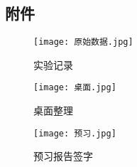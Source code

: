 \documentclass[dvipsnames, svgnames,a4paper,11pt]{article}
\begin{document}
	\subsection{附件}
	\begin{figure}[H]
		\begin{minipage}[b]{0.3\linewidth}
		  \centering
		  \texttt{[image: 原始数据.jpg]}
		  \caption{实验记录}
		\end{minipage}
		\hfill
		\begin{minipage}[b]{0.3\linewidth}
		  \centering
		  \texttt{[image: 桌面.jpg]}
		  \caption{桌面整理}
		\end{minipage}
		\hfill
		\begin{minipage}[b]{0.3\linewidth}
		  \centering
		  \texttt{[image: 预习.jpg]}
		  \caption{预习报告签字}
		\end{minipage}
	\end{figure}

	
	
\end{document}

